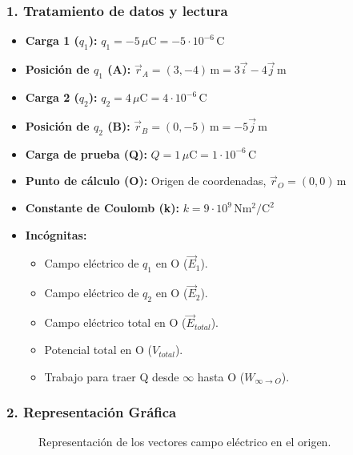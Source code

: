 \subsubsection*{1. Tratamiento de datos y lectura}
\begin{itemize}
    \item \textbf{Carga 1 ($q_1$):} $q_1 = -5\,\mu\text{C} = -5 \cdot 10^{-6}\,\text{C}$
    \item \textbf{Posición de $q_1$ (A):} $\vec{r}_A = (3, -4)\,\text{m} = 3\vec{i} - 4\vec{j}\,\text{m}$
    \item \textbf{Carga 2 ($q_2$):} $q_2 = 4\,\mu\text{C} = 4 \cdot 10^{-6}\,\text{C}$
    \item \textbf{Posición de $q_2$ (B):} $\vec{r}_B = (0, -5)\,\text{m} = -5\vec{j}\,\text{m}$
    \item \textbf{Carga de prueba (Q):} $Q = 1\,\mu\text{C} = 1 \cdot 10^{-6}\,\text{C}$
    \item \textbf{Punto de cálculo (O):} Origen de coordenadas, $\vec{r}_O = (0,0)\,\text{m}$
    \item \textbf{Constante de Coulomb (k):} $k = 9 \cdot 10^9\,\text{N}\text{m}^2/\text{C}^2$
    \item \textbf{Incógnitas:}
    \begin{itemize}
        \item Campo eléctrico de $q_1$ en O ($\vec{E}_1$).
        \item Campo eléctrico de $q_2$ en O ($\vec{E}_2$).
        \item Campo eléctrico total en O ($\vec{E}_{total}$).
        \item Potencial total en O ($V_{total}$).
        \item Trabajo para traer Q desde $\infty$ hasta O ($W_{\infty \to O}$).
    \end{itemize}
\end{itemize}

\subsubsection*{2. Representación Gráfica}
\begin{figure}[H]
    \centering
    \caption{Representación de los vectores campo eléctrico en el origen.}
\end{figure}

